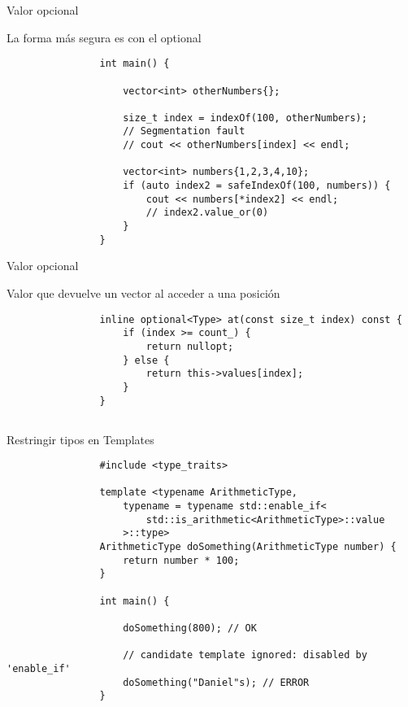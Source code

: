 \documentclass{beamer}
\newcommand{\normalSizeItem}[1] {
  \normalsize{\item #1}
}
\begin{document}
		\begin{frame}[fragile]{Valor opcional}	
			\begin{itemize}
				\normalSizeItem { La forma más segura es con el optional }
				\begin{lstlisting}
				int main() {
	
					vector<int> otherNumbers{};
				
					size_t index = indexOf(100, otherNumbers);
					// Segmentation fault
					// cout << otherNumbers[index] << endl;
					
					vector<int> numbers{1,2,3,4,10};
					if (auto index2 = safeIndexOf(100, numbers)) {
						cout << numbers[*index2] << endl;
						// index2.value_or(0)
					}
				}
				\end{lstlisting}
			\end{itemize}
		\end{frame}
		
		\begin{frame}[fragile]{Valor opcional}	
			\begin{itemize}
				\normalSizeItem { Valor que devuelve un vector al acceder a una posición }
				\begin{lstlisting}
				inline optional<Type> at(const size_t index) const {
					if (index >= count_) {
						return nullopt;
					} else {
						return this->values[index];
					}
				}
				\end{lstlisting}
			\end{itemize}
		\end{frame}
		
		\begin{frame}[fragile]{}
			\subsection{}	
			\begin{itemize}
				\normalSizeItem { Restringir tipos en Templates }
				\begin{lstlisting}
				#include <type_traits>
				
				template <typename ArithmeticType, 
					typename = typename std::enable_if<
						std::is_arithmetic<ArithmeticType>::value
					>::type>
				ArithmeticType doSomething(ArithmeticType number) {
					return number * 100;
				}
				
				int main() {
				
					doSomething(800); // OK
					
					// candidate template ignored: disabled by 'enable_if'
					doSomething("Daniel"s); // ERROR 
				}
				\end{lstlisting}
			\end{itemize}
		\end{frame}
		
\end{document}
